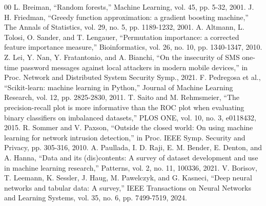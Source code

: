 \documentclass[conference]{IEEEtran}
\begin{document}
\begin{thebibliography}{00}
 L. Breiman, ``Random forests,'' Machine Learning, vol. 45, pp. 5-32, 2001.
 J. H. Friedman, ``Greedy function approximation: a gradient boosting machine,'' The Annals of Statistics, vol. 29, no. 5, pp. 1189-1232, 2001.
 A. Altmann, L. Tolosi, O. Sander, and T. Lengauer, ``Permutation importance: a corrected feature importance measure,'' Bioinformatics, vol. 26, no. 10, pp. 1340-1347, 2010.
 Z. Lei, Y. Nan, Y. Fratantonio, and A. Bianchi, ``On the insecurity of SMS one-time password messages against local attackers in modern mobile devices,'' in Proc. Network and Distributed System Security Symp., 2021.
 F. Pedregosa et al., ``Scikit-learn: machine learning in Python,'' Journal of Machine Learning Research, vol. 12, pp. 2825-2830, 2011.
 T. Saito and M. Rehmsmeier, ``The precision-recall plot is more informative than the ROC plot when evaluating binary classifiers on imbalanced datasets,'' PLOS ONE, vol. 10, no. 3, e0118432, 2015.
 R. Sommer and V. Paxson, ``Outside the closed world: On using machine learning for network intrusion detection,'' in Proc. IEEE Symp. Security and Privacy, pp. 305-316, 2010.
 A. Paullada, I. D. Raji, E. M. Bender, E. Denton, and A. Hanna, ``Data and its (dis)contents: A survey of dataset development and use in machine learning research,'' Patterns, vol. 2, no. 11, 100336, 2021.
 V. Borisov, T. Leemann, K. Sessler, J. Haug, M. Pawelczyk, and G. Kasneci, ``Deep neural networks and tabular data: A survey,'' IEEE Transactions on Neural Networks and Learning Systems, vol. 35, no. 6, pp. 7499-7519, 2024.
\end{thebibliography}
\endgroup
\end{document}
